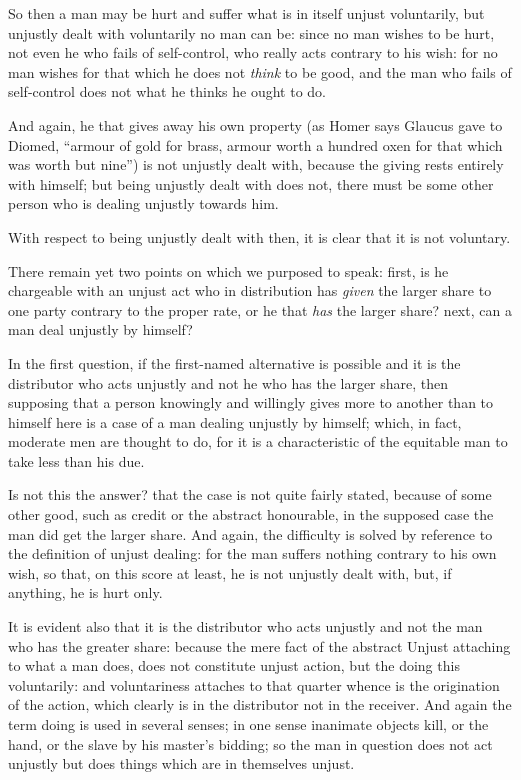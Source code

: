 So then a man may be hurt and suffer what is in itself unjust voluntarily, but
unjustly dealt with voluntarily no man can be: since no man wishes to be hurt,
not even he who fails of self-control, who really acts contrary to his wish:
for no man wishes for that which he does not \emph{think} to be good, and the
man who fails of self-control does not what he thinks he ought to do.

And again, he that gives away his own property (as Homer says Glaucus gave to
Diomed, “armour of gold for brass, armour worth a hundred oxen for that
which was worth but nine”) is not unjustly dealt with, because the giving
rests entirely with himself; but being unjustly dealt with does not, there must
be some other person who is dealing unjustly towards him.

With respect to being unjustly dealt with then, it is clear that it is not
voluntary.


There remain yet two points on which we purposed to speak: first, is he
chargeable with an unjust act who in distribution has \emph{given} the larger
share to one party contrary to the proper rate, or he that \emph{has} the
larger share? next, can a man deal unjustly by himself?

In the first question, if the first-named alternative is possible and it is the
distributor who acts unjustly and not he who has the larger share, then
supposing that a person knowingly and willingly gives more to another than to
himself here is a case of a man dealing unjustly by himself; which, in fact,
moderate men are thought to do, for it is a characteristic of the equitable man
to take less than his due.

Is not this the answer? that the case is not quite fairly stated, because of
some other good, such as credit or the abstract honourable, in the supposed
case the man did get the larger share. And again, the difficulty is solved by
reference to the definition of unjust dealing: for the man suffers nothing
contrary to his own wish, so that, on this score at least, he is not unjustly
dealt with, but, if anything, he is hurt only.

It is evident also that it is the distributor who acts unjustly and not the man
who has the greater share: because the mere fact of the abstract Unjust
attaching to what a man does, does not constitute unjust action, but the doing
this voluntarily: and voluntariness attaches to that quarter whence is the
origination of the action, which clearly is in the distributor not in the
receiver. And again the term doing is used in several senses; in one sense
inanimate objects kill, or the hand, or the slave by his master’s
bidding; so the man in question does not act unjustly but does things which are
in themselves unjust.

